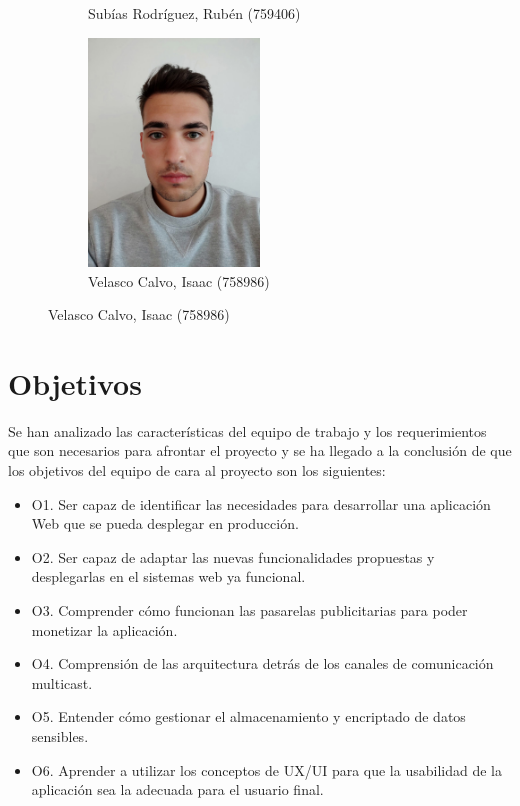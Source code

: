 \documentclass{article}
\begin{document}
\begin{figure}[H]
\begin{subfigure}[b]{0.49\textwidth}
        \caption*{Subías Rodríguez, Rubén (759406)}
     \end{subfigure}
     \hfill
     \begin{subfigure}[b]{0.49\textwidth}
        \centering
        \includegraphics[width=0.5\textwidth]{../images/Andoni.jpeg}
        \caption*{Velasco Calvo, Isaac (758986)}
     \end{subfigure}
 
    \end{figure}
 
\pagebreak
 
\section*{Objetivos}
 
Se han analizado las características del equipo de trabajo y los requerimientos que son necesarios para afrontar el proyecto y se ha llegado a la conclusión de que los objetivos del equipo de cara al proyecto son los siguientes:
 
\begin{itemize}
    \item O1. Ser capaz de identificar las necesidades para desarrollar una aplicación Web que se pueda desplegar en producción.
    \item O2. Ser capaz de adaptar las nuevas funcionalidades propuestas y desplegarlas en el sistemas web ya funcional.
    \item O3. Comprender cómo funcionan las pasarelas publicitarias para poder monetizar la aplicación.
    \item O4. Comprensión de las arquitectura detrás de los  canales de comunicación multicast.
    \item O5. Entender cómo gestionar el almacenamiento y encriptado de datos sensibles.
    \item O6. Aprender a utilizar los conceptos de UX/UI para que la usabilidad de la aplicación sea la adecuada para el usuario final.
\end{itemize}
 
\end{document}

